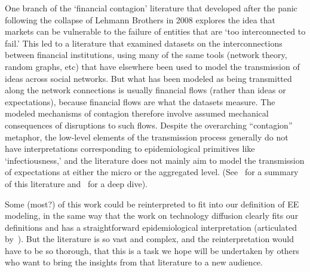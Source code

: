 
One branch of the `financial contagion' literature that developed after the panic following the collapse of Lehmann Brothers in 2008 explores the idea that markets can be vulnerable to the failure of entities that are `too interconnected to fail.' This led to a literature that examined datasets on the interconnections between financial institutions, using many of the same tools (network theory, random graphs, etc) that have elsewhere been used to model the transmission of ideas across social networks.  But what has been modeled as being transmitted along the network connections is usually financial flows (rather than ideas or expectations), because financial flows are what the datasets measure.  The modeled mechanisms of contagion therefore involve assumed mechanical consequences of disruptions to such flows.  Despite the overarching ``contagion'' metaphor, the low-level elements of the transmission process generally do not have interpretations corresponding to epidemiological primitives like `infectiousness,' and the literature does not mainly aim to model the transmission of expectations at either the micro or the aggregated level.  (See~\cite{glasserman2016contagion} for a summary of this literature and~\cite{cabrales2015financial} for a deep dive).

Some (most?) of this work could be reinterpreted to fit into our definition of EE modeling, in the same way that the work on technology diffusion clearly fits our definitions and has a straightforward epidemiological interpretation (articulated by~\cite{arrow_classificatory_1969}).  But the literature is so vast and complex, and the reinterpretation would have to be so thorough, that this is a task we hope will be undertaken by others who want to bring the insights from that literature to a new audience.

